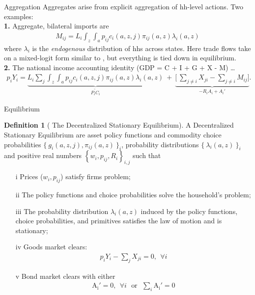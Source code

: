 \documentclass[9pt,pdftex,aspectratio=1610]{beamer}
\theoremstyle{definition}
\newtheorem{df}{Definition}
\begin{document}
\begin{frame}[t]{Aggregation}
\smallskip
Aggregates arise from explicit aggregation of hh-level actions. Two examples:\\
\medskip
\medskip
\textbf{1.} Aggregate, bilateral imports are
\begin{align*}
M_{ij} = L_i \int_{z} \int_{a}  p_{ij} c_{i}(a, z, j) \pi_{ij}(a, z) \lambda_i(a, z)
\end{align*}
where $\lambda_i$ is the \emph{endogenous} distribution of hhs across states. Here trade flows take on a mixed-logit form similar to \citet*{berry1995automobile}, but everything is tied down in equilibrium. \\
\bigskip
\bigskip
\textbf{2.} The national income accounting identity (GDP = C + I + G + X - M) \ldots
\begin{align*}
p_{i} Y_{i}  =  \underbrace{L_{i} \sum_{j} \int_{z} \int_{a}  p_{ij} c_{i}(a, z, j) \pi_{ij}(a, z) \lambda_i(a, z)}_{\widetilde{P_{i} C_i}} \ + \ \underbrace{\bigg[\ \sum_{j\neq i}X_{ji} -  \sum_{j\neq i}M_{ij} \bigg]}_{-R_{i}A_i + A_{i}'}.
\end{align*}
\end{frame}

\begin{frame}[t]{Equilibrium}
\vspace{-.25cm}
\smallskip
{\small
\begin{df}[ {\normalsize The Decentralized Stationary Equilibrium}] \normalfont A Decentralized Stationary Equilibrium are asset policy functions and commodity choice probabilities $\{\  g_{i}(a, z, j), \pi_{ij}(a, z) \ \}_{i}$, probability distributions $\{ \ \lambda_i(a, z) \ \}_{i}$ and positive real numbers $\left \{w_i, p_{ij}, R_i\right \}_{i,j}$ such that
\begin{itemize}
\item[i]  Prices ($w_i, p_{ij}$) satisfy firms problem;
\item[ii] The policy functions and choice probabilities solve the household's problem;
\item[iii] The probability distribution $\lambda_i(a, z)$ induced by the policy functions, choice probabilities, and primitives satisfies the law of motion and is stationary;
\item[iv] Goods market clears:
\begin{align*}
p_{i} Y_{i} - \sum_{j}  X_{ji} = 0, \ \ \forall i
\end{align*}
\item[v] Bond market clears with either
\begin{align*}
\mathrm{A_i'} = 0, \ \ \forall i \ \ \ \mbox{or} \ \ \ \sum_{i}\mathrm{A_i'} = 0
\end{align*}
\end{itemize}
\end{df}
}
\end{frame}
\end{document}
